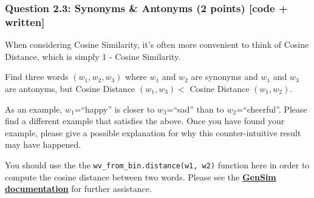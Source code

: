 \documentclass[11pt]{article}
\begin{document}
    \hypertarget{question-2.3-synonyms-antonyms-2-points-code-written}{%
\subsubsection{Question 2.3: Synonyms \& Antonyms (2 points) {[}code +
written{]}}\label{question-2.3-synonyms-antonyms-2-points-code-written}}

When considering Cosine Similarity, it's often more convenient to think
of Cosine Distance, which is simply 1 - Cosine Similarity.

Find three words \((w_1,w_2,w_3)\) where \(w_1\) and \(w_2\) are
synonyms and \(w_1\) and \(w_3\) are antonyms, but Cosine Distance
\((w_1,w_3) <\) Cosine Distance \((w_1,w_2)\).

As an example, \(w_1\)=``happy'' is closer to \(w_3\)=``sad'' than to
\(w_2\)=``cheerful''. Please find a different example that satisfies the
above. Once you have found your example, please give a possible
explanation for why this counter-intuitive result may have happened.

You should use the the \texttt{wv\_from\_bin.distance(w1,\ w2)} function
here in order to compute the cosine distance between two words. Please
see the
\textbf{\href{https://radimrehurek.com/gensim/models/keyedvectors.html\#gensim.models.keyedvectors.FastTextKeyedVectors.distance}{GenSim
documentation}} for further assistance.
\end{document}
